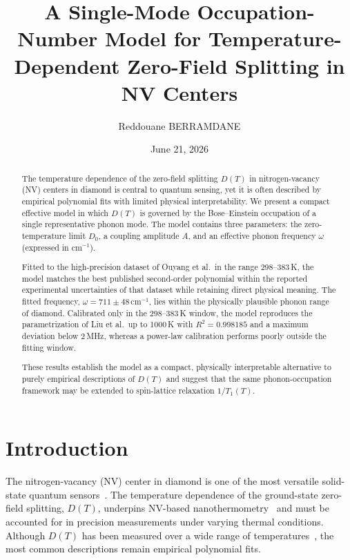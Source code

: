 \documentclass[12pt]{article}
\title{A Single-Mode Occupation-Number Model for Temperature-Dependent Zero-Field Splitting in NV Centers}
\author[1]{\normalsize Reddouane BERRAMDANE}
\affil[1]{\small Independent Researcher}
\date{June 21, 2026}
\begin{document}
\maketitle

\begin{abstract}
The temperature dependence of the zero-field splitting $D(T)$ in nitrogen-vacancy (NV) centers in diamond is central to quantum sensing, yet it is often described by empirical polynomial fits with limited physical interpretability. We present a compact effective model in which $D(T)$ is governed by the Bose--Einstein occupation of a single representative phonon mode. The model contains three parameters: the zero-temperature limit $D_0$, a coupling amplitude $A$, and an effective phonon frequency $\omega$ (expressed in cm$^{-1}$).

Fitted to the high-precision dataset of Ouyang et al.\ in the range 298--383\,K, the model matches the best published second-order polynomial within the reported experimental uncertainties of that dataset while retaining direct physical meaning. The fitted frequency, $\omega = 711 \pm 48\,\mathrm{cm}^{-1}$, lies within the physically plausible phonon range of diamond. Calibrated only in the 298--383\,K window, the model reproduces the parametrization of Liu et al.\ up to 1000\,K with $R^2 = 0.998185$ and a maximum deviation below 2\,MHz, whereas a power-law calibration performs poorly outside the fitting window.

These results establish the model as a compact, physically interpretable alternative to purely empirical descriptions of $D(T)$ and suggest that the same phonon-occupation framework may be extended to spin-lattice relaxation $1/T_1(T)$.
\end{abstract}

\section{Introduction}
The nitrogen-vacancy (NV) center in diamond is one of the most versatile solid-state quantum sensors~\citep{deg2017,barry2020}. The temperature dependence of the ground-state zero-field splitting, $D(T)$, underpins NV-based nanothermometry~\citep{kucsko2013,neumann2013,toyli2013} and must be accounted for in precision measurements under varying thermal conditions. Although $D(T)$ has been measured over a wide range of temperatures~\citep{acosta2010,chen2011,toyli2012,plakhotnik2014,ouyang2024}, the most common descriptions remain empirical polynomial fits.
\end{document}
